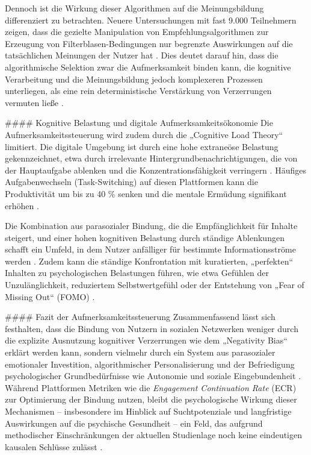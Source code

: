 \documentclass[11pt,a4paper]{article}
\begin{document}
Dennoch ist die Wirkung dieser Algorithmen auf die Meinungsbildung differenziert zu betrachten. Neuere Untersuchungen mit fast 9.000 Teilnehmern zeigen, dass die gezielte Manipulation von Empfehlungsalgorithmen zur Erzeugung von Filterblasen-Bedingungen nur begrenzte Auswirkungen auf die tatsächlichen Meinungen der Nutzer hat \autocite{grey_grey_54e34d5df6ea4df2b6dbbe83e697dac1}. Dies deutet darauf hin, dass die algorithmische Selektion zwar die Aufmerksamkeit binden kann, die kognitive Verarbeitung und die Meinungsbildung jedoch komplexeren Prozessen unterliegen, als eine rein deterministische Verstärkung von Verzerrungen vermuten ließe \autocite{grey_grey_54e34d5df6ea4df2b6dbbe83e697dac1,grey_grey_bbc8a51d8734471c850e8c2939fe8d32}.

\#\#\#\# Kognitive Belastung und digitale Aufmerksamkeitsökonomie Die Aufmerksamkeitssteuerung wird zudem durch die „Cognitive Load Theory“ limitiert. Die digitale Umgebung ist durch eine hohe extraneöse Belastung gekennzeichnet, etwa durch irrelevante Hintergrundbenachrichtigungen, die von der Hauptaufgabe ablenken und die Konzentrationsfähigkeit verringern \autocite{grey_grey_d4bc9c0d0e8441ba90398520e73af07d}. Häufiges Aufgabenwechseln (Task-Switching) auf diesen Plattformen kann die Produktivität um bis zu 40 \% senken und die mentale Ermüdung signifikant erhöhen \autocite{grey_grey_d4bc9c0d0e8441ba90398520e73af07d}.

Die Kombination aus parasozialer Bindung, die die Empfänglichkeit für Inhalte steigert, und einer hohen kognitiven Belastung durch ständige Ablenkungen schafft ein Umfeld, in dem Nutzer anfälliger für bestimmte Informationsströme werden \autocite{grey_grey_5d5c282590c448fc8776b04f78a08de5,grey_grey_d4bc9c0d0e8441ba90398520e73af07d}. Zudem kann die ständige Konfrontation mit kuratierten, „perfekten“ Inhalten zu psychologischen Belastungen führen, wie etwa Gefühlen der Unzulänglichkeit, reduziertem Selbstwertgefühl oder der Entstehung von „Fear of Missing Out“ (FOMO) \autocite{doaj_11fd8100d4c74b18ab12a6bed2c1d2c0,grey_grey_3467cac0f11d4b1e86319128da218a3e,grey_grey_f99abd6bfbd04efc8def60bb6988ce35,grey_grey_8407dc6841b0415a989fd351e0065df0}.

\#\#\#\# Fazit der Aufmerksamkeitssteuerung Zusammenfassend lässt sich festhalten, dass die Bindung von Nutzern in sozialen Netzwerken weniger durch die explizite Ausnutzung kognitiver Verzerrungen wie dem „Negativity Bias“ erklärt werden kann, sondern vielmehr durch ein System aus parasozialer emotionaler Investition, algorithmischer Personalisierung und der Befriedigung psychologischer Grundbedürfnisse wie Autonomie und soziale Eingebundenheit \autocite{europepmc_42073973,grey_grey_5d5c282590c448fc8776b04f78a08de5}. Während Plattformen Metriken wie die \textit{Engagement Continuation Rate} (ECR) zur Optimierung der Bindung nutzen, bleibt die psychologische Wirkung dieser Mechanismen – insbesondere im Hinblick auf Suchtpotenziale und langfristige Auswirkungen auf die psychische Gesundheit – ein Feld, das aufgrund methodischer Einschränkungen der aktuellen Studienlage noch keine eindeutigen kausalen Schlüsse zulässt \autocite{arxiv_2508_02516,biorxiv_PPR621627,openalex_W2924664363}.
\end{document}
